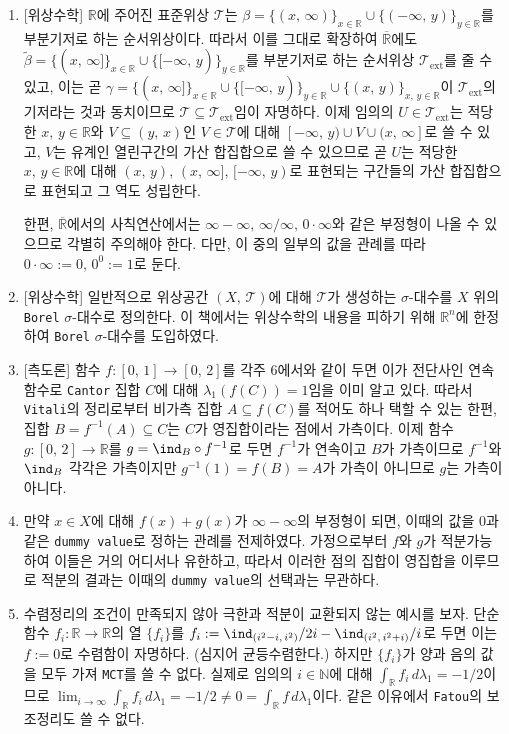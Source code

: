 \begin{enumerate}[label = \textsf{\textbf{\arabic*}}]
    \item \textsf{[위상수학]} $\mathbb{R}$에 주어진 표준위상 $\mathcal{T}$는 $\beta=\{(x,\,\infty)\}_{x\in\mathbb{R}}\cup\{(-\infty,\,y)\}_{y\in\mathbb{R}}$를 부분기저로 하는 순서위상이다. 따라서 이를 그대로 확장하여 $\overline{\mathbb{R}}$에도 $\widetilde{\beta}=\{(x,\,\infty]\}_{x\in\mathbb{R}}\cup\{[-\infty,\,y)\}_{y\in\mathbb{R}}$를 부분기저로 하는 순서위상 $\mathcal{T}_\mathrm{ext}$를 줄 수 있고, 이는 곧 $\gamma=\{(x,\,\infty]\}_{x\in\mathbb{R}}\cup\{[-\infty,\,y)\}_{y\in\mathbb{R}}\cup\{(x,\,y)\}_{x,\,y\in\mathbb{R}}$이 $\mathcal{T}_\mathrm{ext}$의 기저라는 것과 동치이므로 $\mathcal{T}\subseteq\mathcal{T}_\mathrm{ext}$임이 자명하다. 이제 임의의 $U\in\mathcal{T}_\mathrm{ext}$는 적당한 $x,\,y\in\mathbb{R}$와 $V\subseteq(y,\,x)$인 $V\in\mathcal{T}$에 대해 $[-\infty,\,y)\cup V\cup(x,\,\infty]$로 쓸 수 있고, $V$는 유계인 열린구간의 가산 합집합으로 쓸 수 있으므로 곧 $U$는 적당한 $x,\,y\in\mathbb{R}$에 대해 $(x,\,y),\,(x,\,\infty],\,[-\infty,\,y)$로 표현되는 구간들의 가산 합집합으로 표현되고 그 역도 성립한다.

    한편, $\overline{\mathbb{R}}$에서의 사칙연산에서는 $\infty-\infty,\,\infty/\infty,\,0\cdot\infty$와 같은 부정형이 나올 수 있으므로 각별히 주의해야 한다. 다만, 이 중의 일부의 값을 관례를 따라 $0\cdot\infty:=0,\,0^0:=1$로 둔다.
    \item \textsf{[위상수학]} 일반적으로 위상공간 $(X,\,\mathcal{T})$에 대해 $\mathcal{T}$가 생성하는 $\sigma$-대수를 $X$ 위의 \texttt{Borel} $\sigma$-대수로 정의한다. 이 책에서는 위상수학의 내용을 피하기 위해 $\mathbb{R}^n$에 한정하여 \texttt{Borel} $\sigma$-대수를 도입하였다.
    \item \textsf{[측도론]} 함수 $f:[0,\,1]\to[0,\,2]$를 각주 6에서와 같이 두면 이가 전단사인 연속함수로 \texttt{Cantor} 집합 $C$에 대해 $\lambda_1(f(C))=1$임을 이미 알고 있다. 따라서 \texttt{Vitali}의 정리로부터 비가측 집합 $A\subseteq f(C)$를 적어도 하나 택할 수 있는 한편, 집합 $B=f^{-1}(A)\subseteq C$는 $C$가 영집합이라는 점에서 가측이다. 이제 함수 $g:[0,\,2]\to\mathbb{R}$를 $g=\ind_B\circ f^{-1}$로 두면 $f^{-1}$가 연속이고 $B$가 가측이므로 $f^{-1}$와 $\ind_B$ 각각은 가측이지만 $g^{-1}(1)=f(B)=A$가 가측이 아니므로 $g$는 가측이 아니다.
    \item 만약 $x\in X$에 대해 $f(x)+g(x)$가 $\infty-\infty$의 부정형이 되면, 이때의 값을 $0$과 같은 \texttt{dummy value}로 정하는 관례를 전제하였다. 가정으로부터 $f$와 $g$가 적분가능하여 이들은 거의 어디서나 유한하고, 따라서 이러한 점의 집합이 영집합을 이루므로 적분의 결과는 이때의 \texttt{dummy value}의 선택과는 무관하다.
    \item 수렴정리의 조건이 만족되지 않아 극한과 적분이 교환되지 않는 예시를 보자. 단순함수 $f_i:\mathbb{R}\to\mathbb{R}$의 열 $\{f_i\}$를 $f_i:=\ind_{(i^2-i,\,i^2)}/2i-\ind_{(i^2,\,i^2+i)}/i$로 두면 이는 $f:=0$로 수렴함이 자명하다. (심지어 균등수렴한다.) 하지만 $\{f_i\}$가 양과 음의 값을 모두 가져 \texttt{MCT}를 쓸 수 없다. 실제로 임의의 $i\in\mathbb{N}$에 대해 $\int_\mathbb{R}f_i\,d\lambda_1=-1/2$이므로 $\lim_{i\to\infty}\int_\mathbb{R}f_i\,d\lambda_1=-1/2\ne0=\int_\mathbb{R}f\,d\lambda_1$이다. 같은 이유에서 \texttt{Fatou}의 보조정리도 쓸 수 없다.


\end{enumerate}
